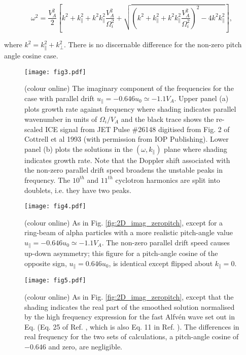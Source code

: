 \documentclass[12pt]{iopart}
\begin{document}
\begin{equation}
  \omega^2 = \frac{V_A^2}{2}\left[
    k^2 + k_\parallel^2 + k^2k_\parallel^2 \frac{V_A^2}{\Omega_i^2}
  + \sqrt{
    \left(k^2 + k_\parallel^2 + k^2k_\parallel^2 \frac{V_A^2}{\Omega_i^2}\right)^2
    - 4k^2 k_\parallel^2
}
  \right],
\label{eqn:fastalfven}
\end{equation}

\noindent where $k^2 = k_\parallel^2 + k_\perp^2$. There is no discernable difference for the non-zero pitch angle cosine case.

\begin{figure}[ht!]
    \raggedleft
\texttt{[image: fig3.pdf]}
    \caption{(colour online) The imaginary component of the frequencies for the
    case with parallel drift $u_{\parallel} = -0.646 u_0 \simeq -1.1 V_A$.
    Upper panel (a) plots growth rate against frequency where shading indicates
    parallel wavenumber in units of $\Omega_i/V_A$ and the black trace shows
    the re-scaled ICE signal from JET Pulse \#26148 digitised from Fig. 2 of
    Cottrell et al 1993 (with permission from IOP Publishing). Lower panel (b)
    plots the solutions
    in the $(\omega,k_\parallel)$ plane where shading indicates growth rate. Note
    that the Doppler shift associated with the non-zero parallel drift speed
    broadens the unstable peaks in frequency. The $10^{th}$ and $11^{th}$ cyclotron
    harmonics are split into doublets, i.e. they have two peaks.}
    \label{fig:2D_F12_physicalpitch}
\end{figure}

\begin{figure}[ht!]
    \raggedleft
\texttt{[image: fig4.pdf]}
    \caption{(colour online) As in Fig. \ref{fig:2D_imag_zeropitch}, except for
    a ring-beam of alpha particles with a more realistic pitch-angle value
    $u_{\parallel} = -0.646 u_0 \simeq -1.1 V_A$. The non-zero parallel drift
    speed causes up-down asymmetry; this figure for a pitch-angle cosine of the
    opposite sign, $u_{\parallel} = 0.646 u_0$, is identical except flipped
    about $k_\parallel=0$.}
    \label{fig:2D_imag_physicalpitch}
\end{figure}


\begin{figure}[ht!]
    \raggedleft
\texttt{[image: fig5.pdf]}
    \caption{(colour online) As in Fig. \ref{fig:2D_imag_zeropitch}, except that
    the shading indicates the real part of the smoothed solution normalised by
    the high frequency expression for the fast Alfv{\'e}n wave set out in
    Eq. \label{eqn:fastalfven} (Eq. 25 of Ref. \cite{Dendy1994},
    which is also Eq. 11 in Ref. \cite{McClements1996}).
    The differences in real frequency for the two sets of
    calculations, a pitch-angle cosine of $-0.646$ and zero, are
    negligible.}
    \label{fig:2D_real_zeropitch}
\end{figure}
\end{document}
